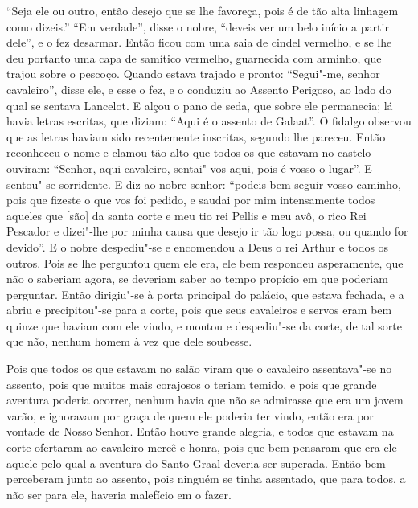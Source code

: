 “Seja ele ou outro, então desejo que se lhe favoreça, pois é de tão alta
linhagem como dizeis.” “Em verdade”, disse o nobre, “deveis ver um belo início
a partir dele”, e o fez desarmar. Então ficou com uma saia de cindel vermelho,
e se lhe deu portanto uma capa de samítico vermelho, guarnecida com arminho,
que trajou sobre o pescoço. Quando estava trajado e pronto: “Segui"-me, senhor
cavaleiro”, disse ele, e esse o fez, e o conduziu ao Assento Perigoso, ao lado
do qual se sentava Lancelot. E alçou o pano de seda, que sobre ele permanecia;
lá havia letras escritas, que diziam: “Aqui é o assento de Galaat”. O fidalgo
observou que as letras haviam sido recentemente inscritas, segundo lhe pareceu.
Então reconheceu o nome e clamou tão alto que todos os que estavam no castelo
ouviram: “Senhor, aqui cavaleiro, sentai"-vos aqui, pois é vosso o lugar”. E
sentou"-se sorridente. E diz ao nobre senhor: “podeis bem seguir vosso caminho,
pois que fizeste o que vos foi pedido, e saudai por mim intensamente todos
aqueles que [são] da santa corte e meu tio rei Pellis e meu avô, o rico Rei Pescador
e dizei"-lhe por minha causa que desejo ir tão logo possa, ou quando for
devido”. E o nobre despediu"-se e encomendou a Deus o rei Arthur e todos os
outros.  Pois se lhe perguntou quem ele era, ele bem respondeu asperamente, que
não o saberiam agora, se deveriam saber ao tempo propício em que poderiam
perguntar. Então dirigiu"-se à porta principal do palácio, que estava fechada, e
a abriu e precipitou"-se para a corte, pois que seus cavaleiros e servos eram
bem quinze que haviam com ele vindo, e montou e despediu"-se da corte, de tal
sorte que não, nenhum homem à vez que dele soubesse. 

Pois que todos os que estavam no salão viram que o cavaleiro assentava"-se no
assento, pois que muitos mais corajosos o teriam temido, e pois que grande
aventura poderia ocorrer, nenhum havia que não se admirasse que era um jovem
varão, e ignoravam por graça de quem ele poderia ter vindo, então era por
vontade de Nosso Senhor. Então houve grande alegria, e todos que estavam na
corte ofertaram ao cavaleiro mercê e honra, pois que bem pensaram que era ele
aquele pelo qual a aventura do Santo Graal deveria ser superada. Então
bem perceberam junto ao assento, pois ninguém se tinha assentado, que para
todos, a não ser para ele, haveria malefício em o fazer. 

